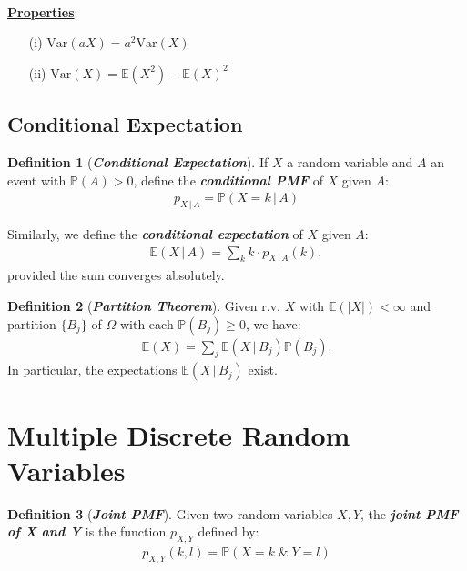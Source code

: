 \documentclass[12pt]{extarticle}
\newcommand{\pstart}[0]{\noindent}
\newcommand{\term}[1]{\textbf{\textit{#1}}}
\newcommand{\titleul}[1]{\pstart\textbf{\ul{#1}}}
\theoremstyle{definition}
\newtheorem*{definition}{Definition}
\theoremstyle{remark}
\newcommand{\prob}[1]{\mathbb{P}\left(#1\right)}
\newcommand{\cond}[2]{#1\,\vert\,#2}
\newcommand{\expected}[1]{\mathbb{E}\left(#1\right)}
\newcommand{\variance}[1]{\text{Var}\left(#1\right)}
\begin{document}
~\\
\titleul{Properties}: \begin{enumerate}
    \item[(i)] $\variance{aX}=a^2\variance{X}$
    \item[(ii)] $\variance{X}=\expected{X^2}-\expected{X}^2$
\end{enumerate}

\subsection{Conditional Expectation}
\begin{tcolorbox}[colback=green!10!white]
    \begin{definition}[\term{Conditional Expectation}]
        If $X$ a random variable and $A$ an event with $\prob{A}>0$, 
define the \term{conditional PMF} of $X$ given $A$: \begin{align*}
            p_{\cond{X}{A}}=\prob{\cond{X=k}{A}}
        \end{align*}
    
        Similarly, we define the \term{conditional expectation} of $X$ 
given $A$: \begin{align*}
            \expected{\cond{X}{A}}=\sum_k k\cdot p_{\cond{X}{A}}(k),
        \end{align*}
        provided the sum converges absolutely.
    \end{definition}
\end{tcolorbox}

\begin{definition}[\term{Partition Theorem}]
    Given r.v. $X$ with $\expected{|X|}<\infty$ and partition $\{B_j\}$ of 
$\Omega$ with each $\prob{B_j}\geq0$, we have: \begin{align*}
        \expected{X}=\sum_j\expected{\cond{X}{B_j}}\prob{B_j}.
    \end{align*}
    In particular, the expectations $\expected{\cond{X}{B_j}}$ exist.
\end{definition}

\pagebreak
\section{Multiple Discrete Random Variables}
\begin{tcolorbox}[colback=blue!80!green!10!white]
    \begin{definition}[\term{Joint PMF}]
        Given two random variables $X,Y$, the \term{joint PMF of X and Y} 
is the function $p_{X,Y}$ defined by: \begin{align*}
            p_{X,Y}(k,l)=\prob{X=k\;\&\;Y=l}
        \end{align*}
    \end{definition}
\end{tcolorbox}
\end{document}
